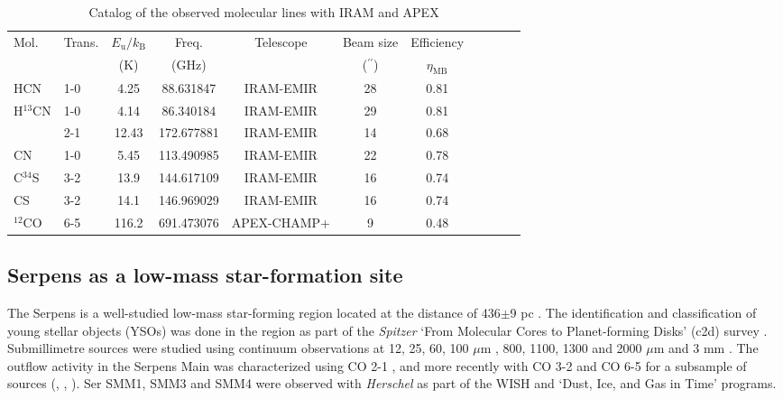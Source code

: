 \documentclass{aa}
\begin{document}
\begin{table*} 
\caption{Catalog of the observed molecular lines with IRAM and APEX \label{table:lines}} 
\centering 
\begin{tabular}{l l c c c c c c c c c }
\hline \hline 
Mol. & Trans. & $E_\mathrm{u}/k_\mathrm{B}$ & Freq. & Telescope & Beam size & Efficiency \\
& & (K) & (GHz) & &($^{\prime\prime}$) & $\eta_\mathrm{MB}$\\ 
\hline %
HCN & 1-0 & 4.25 & 88.631847 & IRAM-EMIR & 28 & 0.81 \\ 
H$^{13}$CN & 1-0 & 4.14 & 86.340184 & IRAM-EMIR & 29 & 0.81 \\ 
~ & 2-1 & 12.43 & 172.677881 & IRAM-EMIR & 14 & 0.68 \\ 
CN & 1-0 & 5.45 & 113.490985 & IRAM-EMIR & 22 & 0.78 \\ 
C$^{34}$S & 3-2 & 13.9 & 144.617109 & IRAM-EMIR & 16 & 0.74 \\
CS & 3-2 & 14.1 & 146.969029 & IRAM-EMIR & 16 & 0.74 \\ 
$^{12}$CO & 6-5 & 116.2 & 691.473076 & APEX-CHAMP+ & 9 & 0.48 \\
\hline 
\end{tabular} 

 
\end{table*}
\subsection{Serpens as a low-mass star-formation site}
\label{subsection:serpens}


The Serpens is a well-studied low-mass star-forming region located at the 
distance of 436$\pm$9 pc \citep{Ort17}. The identification and classification of young 
stellar objects (YSOs) was done in the region as part of the \textit{Spitzer} ‘From Molecular Cores to
Planet-forming Disks’ (c2d) survey \citep{Har07,Eno09,Eva09,Dun15}. 
Submillimetre sources were studied using continuum observations at 12, 25, 60, 100 $\mu$m \citep{Hur96}, 800, 1100, 1300 and 2000 $\mu$m \citep{Cas93} and 3 mm \citep{Tes98}. The outflow activity in the Serpens Main was characterized using CO 2-1 \citep{Dav99}, and 
more recently with CO 3-2 and CO 6-5 for a subsample of sources (\citealt{Gra10}, \citealt{Dio10}, \citealt{Yil15}). Ser SMM1, SMM3 and 
SMM4 were observed with \textit{Herschel} as part of the WISH and `Dust, Ice, and Gas in Time' 
\citep[DIGIT,][]{Gre13,Gre16,YL18} programs. 
\end{document}
